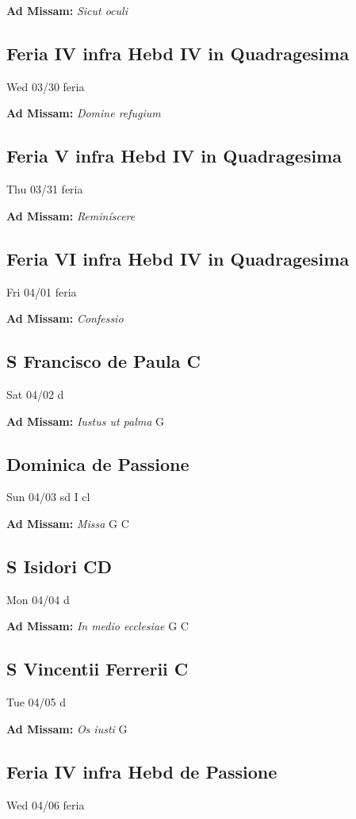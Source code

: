 \documentclass[letterpaper, 10pt, twocolumn]{article}
\begin{document}
\textbf{Ad Missam:} \textit{Sicut oculi} 

\subsection*{Feria IV infra Hebd IV in Quadragesima }Wed 03/30 feria

\textbf{Ad Missam:} \textit{Domine refugium} 

\subsection*{Feria V infra Hebd IV in Quadragesima }Thu 03/31 feria

\textbf{Ad Missam:} \textit{Reminíscere} 

\subsection*{Feria VI infra Hebd IV in Quadragesima }Fri 04/01 feria

\textbf{Ad Missam:} \textit{Confessio} 

\subsection*{S Francisco de Paula C}Sat 04/02 d

\textbf{Ad Missam:} \textit{Iustus ut palma} G 

\subsection*{Dominica de Passione}Sun 04/03 sd I cl

\textbf{Ad Missam:} \textit{Missa} G C 

\subsection*{S Isidori CD}Mon 04/04 d

\textbf{Ad Missam:} \textit{In medio ecclesiae} G C 

\subsection*{S Vincentii Ferrerii C}Tue 04/05 d

\textbf{Ad Missam:} \textit{Os iusti} G 

\subsection*{Feria IV infra Hebd de Passione}Wed 04/06 feria
\end{document}
